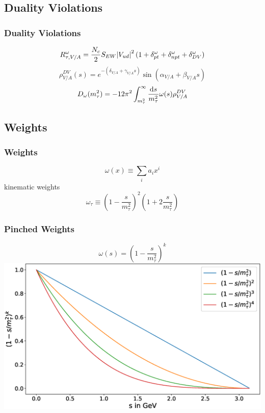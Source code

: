 \documentclass[fleqn]{beamer}
\begin{document}
\subsection{Duality Violations}
\begin{frame}
  \frametitle{Duality Violations}
  \begin{equation}
    R_{\tau,V/A}^\omega = \frac{N_c}{2} S_{EW} \abs{V_{ud}}^2 (1 + \delta_{pt}^\omega + \delta_{npt}^\omega + \delta_{DV}^\omega)
  \end{equation}
  \begin{equation}
    \rho_{V/A}^{DV}(s) = e^{-(\delta_{V/A} + \gamma_{V/A}s)} \sin(\alpha_{V/A} + \beta_{V/A}s)
  \end{equation}
  \begin{equation}
    D_\omega(m_\tau^2) = -12 \pi^2 \int_{m_\tau^2}^\infty \frac{\dif s}{m_\tau^2} \omega(s) \rho_{V/A}^{DV}
  \end{equation}
\end{frame}

\subsection{Weights}
\begin{frame}
  \frametitle{Weights}
  \begin{equation}
    \omega(x) \equiv \sum_i a_i x^i
  \end{equation}
  kinematic weights
  \begin{equation}
    \omega_\tau \equiv (1 - \frac{s}{m_\tau^2})^2(1 + 2 \frac{s}{m_\tau^2})
  \end{equation}
\end{frame}

\begin{frame}
  \frametitle{Pinched Weights}
  \begin{equation}
    \omega(s) = \left( 1 - \frac{s}{m_\tau^2} \right)^k
  \end{equation}
  \includegraphics[width=\textwidth]{./images/monomialWeightGraphs.eps}
\end{frame}
\end{document}
